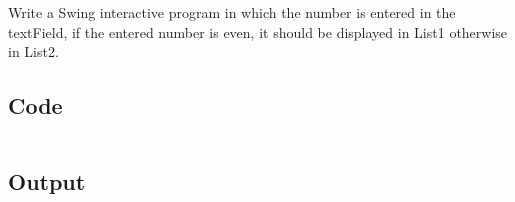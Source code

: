 \documentclass[../main.tex]{subfiles}
\begin{document}
Write a Swing interactive program in which the number is entered in the
textField, if the entered number is even, it should be displayed in List1
otherwise in List2.

\subsection{Code}
\inputminted[frame=lines, breaklines, breakanywhere, numberblanklines=false]{java}{./programs/prog12/Swing.java}

\subsection{Output}
\end{document}
